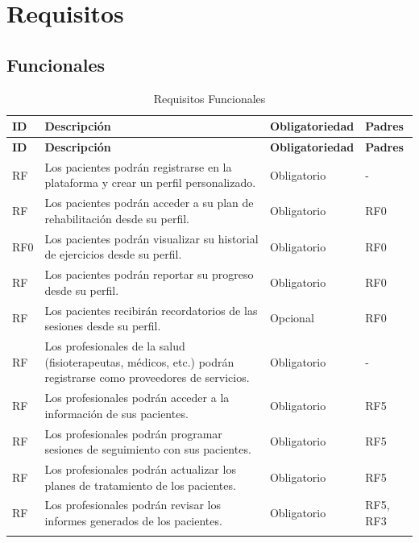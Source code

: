 \documentclass{article}
\begin{document}
	
	\section{Requisitos}
	
	\subsection{Funcionales}
	
\begin{longtable}{@{} p{2.5cm} p{6.5cm} p{3cm} p{3cm} @{}}
	\caption{Requisitos Funcionales}\\
	\toprule
	\textbf{ID} & \textbf{Descripción} & \textbf{Obligatoriedad} & \textbf{Padres} \\
	\midrule
	\endfirsthead
	
	\toprule
	\textbf{ID} & \textbf{Descripción} & \textbf{Obligatoriedad} & \textbf{Padres} \\
	\midrule
	\endhead
	
	\addlinespace
	RF\therequisitosFuncionales & Los pacientes podrán registrarse en la plataforma y crear un perfil personalizado. & Obligatorio & - \\ 
	\addlinespace \stepcounter{requisitosFuncionales}
	RF\therequisitosFuncionales & Los pacientes podrán acceder a su plan de rehabilitación desde su perfil. & Obligatorio & RF0\\ 
	\addlinespace \stepcounter{requisitosFuncionales}
	RF0 & Los pacientes podrán visualizar su historial de ejercicios desde su perfil. & Obligatorio & RF0 \\ 
	\addlinespace \stepcounter{requisitosFuncionales}
	RF\therequisitosFuncionales & Los pacientes podrán reportar su progreso desde su perfil. & Obligatorio & RF0 \\ 
	\addlinespace \stepcounter{requisitosFuncionales}
	RF\therequisitosFuncionales & Los pacientes recibirán recordatorios de las sesiones desde su perfil. & Opcional & RF0 \\ 
	\addlinespace \stepcounter{requisitosFuncionales}
	RF\therequisitosFuncionales & Los profesionales de la salud (fisioterapeutas, médicos, etc.) podrán registrarse como proveedores de servicios. & Obligatorio & - \\ 
	\addlinespace \stepcounter{requisitosFuncionales}
	RF\therequisitosFuncionales & Los profesionales podrán acceder a la información de sus pacientes. & Obligatorio & RF5 \\ 
	\addlinespace \stepcounter{requisitosFuncionales}
	RF\therequisitosFuncionales & Los profesionales podrán programar sesiones de seguimiento con sus pacientes. & Obligatorio & RF5 \\ 
	\addlinespace \stepcounter{requisitosFuncionales}
	RF\therequisitosFuncionales & Los profesionales podrán actualizar los planes de tratamiento de los pacientes. & Obligatorio & RF5 \\ 
	\addlinespace \stepcounter{requisitosFuncionales}
	RF\therequisitosFuncionales & Los profesionales podrán revisar los informes generados de los pacientes. & Obligatorio & RF5, RF3\\ 
	\addlinespace \stepcounter{requisitosFuncionales}
	 


\end{longtable}
\end{document}

